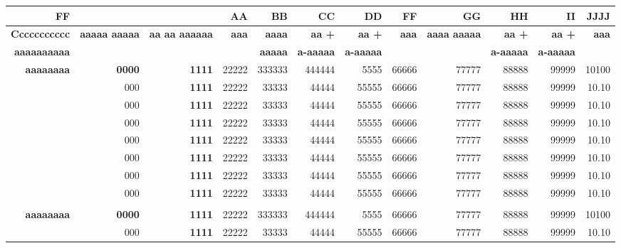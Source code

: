 \onecolumn
\begin{landscape}
  \begin{longtable}[htbp]
  \centering\small
  \caption*{My Results}
    \begin{tabular}{rrrrrrrrrrrr}
    \toprule
    \textbf{FF} & \textbf{} & \textbf{} & \textbf{AA} & \textbf{BB} & \textbf{CC} & \textbf{DD} & \textbf{FF} & \textbf{GG} & \textbf{HH} & \textbf{II} & \textbf{JJJJ} \\
    \midrule
    \textbf{Ccccccccccc} & \multirow{2}[2]{*}{\textbf{aaaaa aaaaa}} & \multirow{2}[2]{*}{\textbf{aa aa aaaaaa}} & \multirow{2}[2]{*}{\textbf{aaa}} & \textbf{aaaa} & \textbf{aa +} & \textbf{aa +} & \multirow{2}[2]{*}{\textbf{aaa}} & \multirow{2}[2]{*}{\textbf{aaaa aaaaa}} & \textbf{aa +} & \textbf{aa +} & \multirow{2}[2]{*}{\textbf{aaa}} \\
    \textbf{aaaaaaaaaa} &       &       &       & \textbf{aaaaa} & \textbf{a-aaaaa} & \textbf{a-aaaaa} &       &       & \textbf{a-aaaaa} & \textbf{a-aaaaa} &  \\
    \midrule
    \textbf{aaaaaaaa} & \textbf{0000} & \textbf{1111} & 22222 & 333333 & 444444 & 5555  & 66666 & 77777 & 88888 & 99999 & 10100 \\
          & 000   & \textbf{1111} & 22222 & 33333 & 44444 & 55555  & 66666 & 77777 & 88888 & 99999 & 10.10 \\
          & 000   & \textbf{1111} & 22222 & 33333 & 44444 & 55555  & 66666 & 77777 & 88888 & 99999 & 10.10 \\
          & 000   & \textbf{1111} & 22222 & 33333 & 44444 & 55555  & 66666 & 77777 & 88888 & 99999 & 10.10 \\
          & 000   & \textbf{1111} & 22222 & 33333 & 44444 & 55555  & 66666 & 77777 & 88888 & 99999 & 10.10 \\
          & 000   & \textbf{1111} & 22222 & 33333 & 44444 & 55555  & 66666 & 77777 & 88888 & 99999 & 10.10 \\
          & 000   & \textbf{1111} & 22222 & 33333 & 44444 & 55555  & 66666 & 77777 & 88888 & 99999 & 10.10 \\
          & 000   & \textbf{1111} & 22222 & 33333 & 44444 & 55555  & 66666 & 77777 & 88888 & 99999 & 10.10 \\\\
    \textbf{aaaaaaaa} & \textbf{0000} & \textbf{1111} & 22222 & 333333 & 444444 & 5555  & 66666 & 77777 & 88888 & 99999 & 10100 \\
          & 000   & \textbf{1111} & 22222 & 33333 & 44444 & 55555  & 66666 & 77777 & 88888 & 99999 & 10.10 \\

\end{tabular}
\end{longtable}
\end{landscape}
